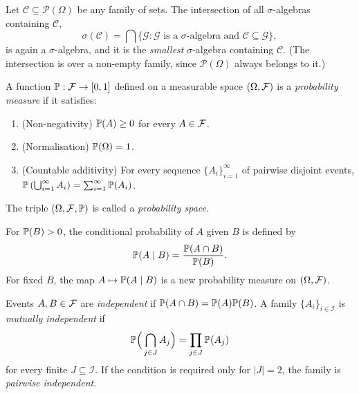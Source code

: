 \documentclass[main.tex]{subfiles}
\begin{document}
\begin{definition}
Let $\mathcal{C}\subseteq\mathcal{P}(\Omega)$ be any family of sets. The intersection of all $\sigma$-algebras containing $\mathcal{C}$,
\[
\sigma(\mathcal{C}) = \bigcap\{\mathcal{G} : \mathcal{G} \text{ is a } \sigma\text{-algebra and } \mathcal{C}\subseteq\mathcal{G}\},
\]
is again a $\sigma$-algebra, and it is the \emph{smallest} $\sigma$-algebra containing $\mathcal{C}$. (The intersection is over a non-empty family, since $\mathcal{P}(\Omega)$ always belongs to it.)
\end{definition}

\begin{definition}\label{def:kolmogorov}
A function $\P: \F \to [0, 1]$ defined on a measurable space $(\Omega, \F)$ is a \emph{probability measure} if it satisfies:
\begin{enumerate}
    \item (Non-negativity) $\P(A) \ge 0$ for every $A \in \F$.
    \item (Normalisation) $\P(\Omega) = 1$.
    \item (Countable additivity) For every sequence $\{A_i\}_{i=1}^\infty$ of pairwise disjoint events, $\P\left(\bigcup_{i=1}^\infty A_i\right) = \sum_{i=1}^\infty \P(A_i)$.
\end{enumerate}
The triple $(\Omega,\F,\P)$ is called a \emph{probability space}.
\end{definition}

\begin{definition}
For $\P(B)>0$, the conditional probability of $A$ given $B$ is defined by
\[
\P(A\mid B) = \frac{\P(A\cap B)}{\P(B)} .
\]
For fixed $B$, the map $A\mapsto \P(A\mid B)$ is a new probability measure on $(\Omega,\F)$.
\end{definition}

\begin{definition}[Independence]
Events $A,B\in\F$ are \emph{independent} if $\P(A\cap B)=\P(A)\P(B)$. A family $\{A_i\}_{i\in\mathcal{I}}$ is \emph{mutually independent} if
\[
\P\Big(\bigcap_{j\in J} A_j\Big) = \prod_{j\in J}\P(A_j)
\]
for every finite $J\subseteq\mathcal{I}$. If the condition is required only for $|J|=2$, the family is \emph{pairwise independent}.
\end{definition}
\end{document}
